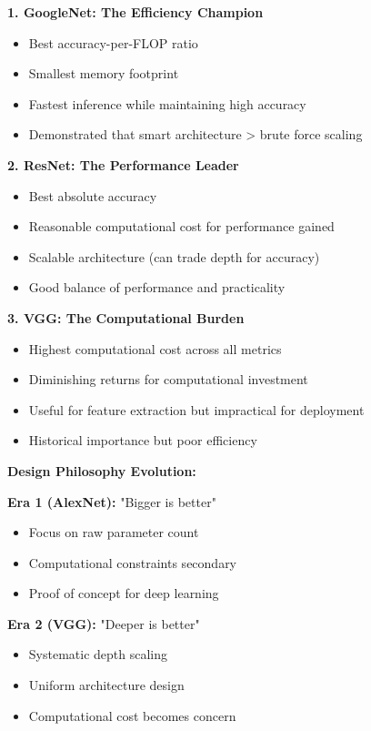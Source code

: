 \documentclass[12pt]{article}
\begin{document}
\begin{enumerate}[(a)]
{    \textbf{1. GoogleNet: The Efficiency Champion}
    \begin{itemize}
        \item Best accuracy-per-FLOP ratio
        \item Smallest memory footprint
        \item Fastest inference while maintaining high accuracy
        \item Demonstrated that smart architecture > brute force scaling
    \end{itemize}
    
    \textbf{2. ResNet: The Performance Leader}
    \begin{itemize}
        \item Best absolute accuracy
        \item Reasonable computational cost for performance gained
        \item Scalable architecture (can trade depth for accuracy)
        \item Good balance of performance and practicality
    \end{itemize}
    
    \textbf{3. VGG: The Computational Burden}
    \begin{itemize}
        \item Highest computational cost across all metrics
        \item Diminishing returns for computational investment
        \item Useful for feature extraction but impractical for deployment
        \item Historical importance but poor efficiency
    \end{itemize}
    
    \textbf{Design Philosophy Evolution:}
    
    \textbf{Era 1 (AlexNet):} "Bigger is better"
    \begin{itemize}
        \item Focus on raw parameter count
        \item Computational constraints secondary
        \item Proof of concept for deep learning
    \end{itemize}
    
    \textbf{Era 2 (VGG):} "Deeper is better"
    \begin{itemize}
        \item Systematic depth scaling
        \item Uniform architecture design
        \item Computational cost becomes concern
    \end{itemize}
    
}
\end{enumerate}
\end{document}
